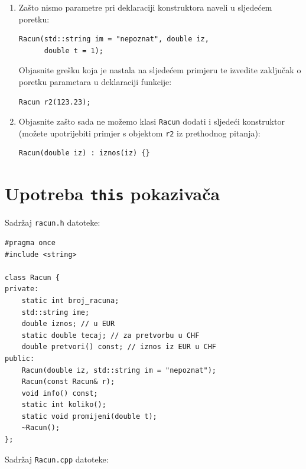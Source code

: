 \begin{razmisljanje}
    \begin{enumerate}
        \item 
    Zašto nismo parametre pri deklaraciji konstruktora naveli u sljedećem poretku:
    \begin{verbatim}
Racun(std::string im = "nepoznat", double iz, 
      double t = 1);
    \end{verbatim}
    Objasnite grešku koja je nastala na sljedećem primjeru te izvedite zaključak
    o poretku parametara u deklaraciji funkcije:
    \begin{verbatim}
Racun r2(123.23);
    \end{verbatim}

    \item 
    Objasnite zašto sada ne možemo klasi \texttt{Racun} dodati i sljedeći konstruktor
    (možete upotrijebiti primjer s objektom \texttt{r2} iz prethodnog pitanja):
    \begin{verbatim}
Racun(double iz) : iznos(iz) {}
    \end{verbatim}
    \end{enumerate}
\end{razmisljanje}



\section{Upotreba \texttt{this} pokazivača}

Sadržaj \texttt{racun.h} datoteke:

\begin{verbatim}
#pragma once
#include <string>

class Racun {
private:
	static int broj_racuna;
	std::string ime;
	double iznos; // u EUR
	static double tecaj; // za pretvorbu u CHF
	double pretvori() const; // iznos iz EUR u CHF
public:
	Racun(double iz, std::string im = "nepoznat");
	Racun(const Racun& r);
	void info() const;
	static int koliko();
	static void promijeni(double t);
	~Racun();
};
\end{verbatim}


Sadržaj \texttt{Racun.cpp} datoteke:

